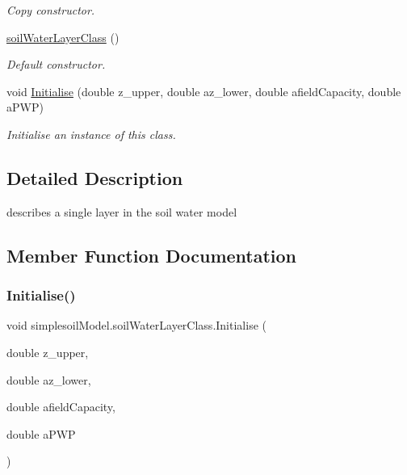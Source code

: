 \begin{DoxyCompactItemize}
\begin{DoxyCompactList}\small\item\em Copy constructor. \end{DoxyCompactList}\item 
\mbox{\label{classsimplesoil_model_1_1soil_water_layer_class_ae30c9a4959408ccca1cfc3233d96e9da}} 
\mbox{\hyperlink{classsimplesoil_model_1_1soil_water_layer_class_ae30c9a4959408ccca1cfc3233d96e9da}{soil\+Water\+Layer\+Class}} ()
\begin{DoxyCompactList}\small\item\em Default constructor. \end{DoxyCompactList}\item 
void \mbox{\hyperlink{classsimplesoil_model_1_1soil_water_layer_class_aeb0889b8e65ad603be4d729c3eef94db}{Initialise}} (double z\+\_\+upper, double az\+\_\+lower, double afield\+Capacity, double a\+P\+WP)
\begin{DoxyCompactList}\small\item\em Initialise an instance of this class. \end{DoxyCompactList}\end{DoxyCompactItemize}


\subsection{Detailed Description}
describes a single layer in the soil water model 

\subsection{Member Function Documentation}
\mbox{\label{classsimplesoil_model_1_1soil_water_layer_class_aeb0889b8e65ad603be4d729c3eef94db}} 
\subsubsection{\texorpdfstring{Initialise()}{Initialise()}}
{\footnotesize\ttfamily void simplesoil\+Model.\+soil\+Water\+Layer\+Class.\+Initialise (\begin{DoxyParamCaption}\item[{double}]{z\+\_\+upper,  }\item[{double}]{az\+\_\+lower,  }\item[{double}]{afield\+Capacity,  }\item[{double}]{a\+P\+WP }\end{DoxyParamCaption})\hspace{0.3cm}{\ttfamily [inline]}}



